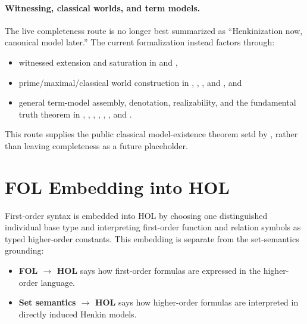 \documentclass[11pt,openany]{report}
\begin{document}
\paragraph{Witnessing, classical worlds, and term models.}
The live completeness route is no longer best summarized as ``Henkinization now,
canonical model later.''  The current formalization instead factors through:
\begin{itemize}
\item witnessed extension and saturation in
   and
  ,
\item prime/maximal/classical world construction in
  ,
  ,
  , and
  , and
\item general term-model assembly, denotation, realizability, and the
  fundamental truth theorem in
  ,
  ,
  ,
  ,
  ,
  , and
  .
\end{itemize}
This route supplies the public classical model-existence theorem setd by
, rather than leaving completeness as a
future placeholder.

\section{FOL Embedding into HOL}

First-order syntax is embedded into HOL by choosing one distinguished
individual base type and interpreting first-order function and relation
symbols as typed higher-order constants.  This embedding is separate from the
set-semantics grounding:
\begin{itemize}
\item \textbf{FOL $\to$ HOL} says how first-order formulas are expressed in the
  higher-order language.
\item \textbf{Set semantics $\to$ HOL} says how higher-order formulas are
  interpreted in directly induced Henkin models.
\end{itemize}
\end{document}
